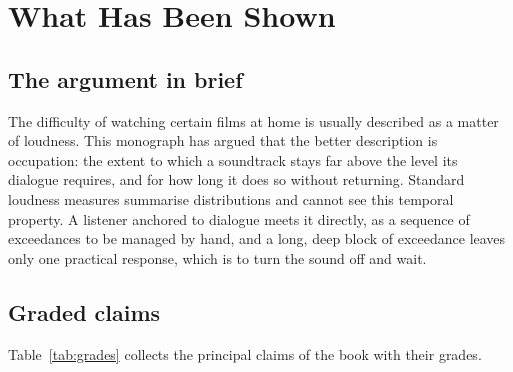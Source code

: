 \chapter{What Has Been Shown}
\label{ch:conclusion}

\section{The argument in brief}

The difficulty of watching certain films at home is usually described as a matter of loudness. This monograph has argued that the better description is occupation: the extent to which a soundtrack stays far above the level its dialogue requires, and for how long it does so without returning. Standard loudness measures summarise distributions and cannot see this temporal property. A listener anchored to dialogue meets it directly, as a sequence of exceedances to be managed by hand, and a long, deep block of exceedance leaves only one practical response, which is to turn the sound off and wait.

\section{Graded claims}

Table~\ref{tab:grades} collects the principal claims of the book with their grades.

